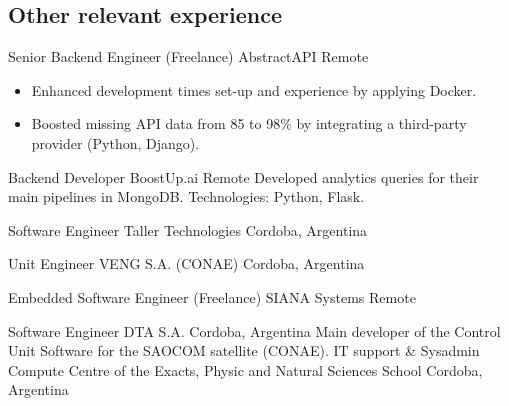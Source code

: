 \subsection{Other relevant experience}
    {Senior Backend Engineer (Freelance)} %
    {AbstractAPI} %
    {Remote} %
    {}
    {
      \begin{itemize}
        \item {Enhanced development times set-up and experience by applying Docker.}
        \item {Boosted missing API data from 85 to 98\% by integrating a third-party provider (Python, Django).}
      \end{itemize}
    }
    {Backend Developer} %
    {BoostUp.ai} %
    {Remote} %
    {}
    {Developed analytics queries for their main pipelines in MongoDB. Technologies: Python, Flask.}

    {Software Engineer} %
    {Taller Technologies} %
    {Cordoba, Argentina} %
    {}
    {}

    {Unit Engineer} %
    {VENG S.A. (CONAE)} %
    {Cordoba, Argentina} %
    {}
    {}

    {Embedded Software Engineer (Freelance)} %
    {SIANA Systems} %
    {Remote} %
    {}
    {}

    {Software Engineer} %
    {DTA S.A.} %
    {Cordoba, Argentina} %
    {}
    {Main developer of the Control Unit Software for the SAOCOM satellite (CONAE).}
    {IT support \& Sysadmin} %
    {Compute Centre of the Exacts, Physic and Natural Sciences School} %
    {Cordoba, Argentina} %
    {}
    {}

